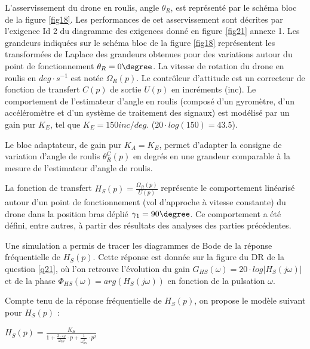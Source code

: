 L'asservissement du drone en roulis, angle $\theta_R$, est représenté par le schéma bloc de la figure \ref{fig18}. Les performances de cet asservissement sont décrites par l'exigence Id 2 du diagramme des exigences donné en figure \ref{fig21} annexe 1. Les grandeurs indiquées sur le schéma bloc de la figure \ref{fig18} représentent les transformées de Laplace des grandeurs obtenues pour des variations autour du point de fonctionnement $\theta_R=0\degree$. La vitesse de rotation du drone en roulis en $deg\cdot s^{-1}$ est notée $\Omega_R(p)$. Le contrôleur d'attitude est un correcteur de fonction de transfert $C(p)$ de sortie $U(p)$ en incréments (inc). Le comportement de l'estimateur d'angle en roulis (composé d'un gyromètre, d'un accéléromètre et d'un système de traitement des signaux) est modélisé par un gain pur $K_E$, tel que $K_E= 150 inc/deg$. ($20\cdot log(150)=43.5$).

Le bloc adaptateur, de gain pur $K_A=K_E$, permet d'adapter la consigne de variation d'angle de roulis $\theta_R^C(p)$ en degrés en une grandeur comparable à la mesure de l'estimateur d'angle de roulis.

La fonction de transfert $H_S(p)=\frac{\Omega_R(p)}{U(p)}$ représente le comportement linéarisé autour d'un point de fonctionnement (vol d'approche à vitesse constante) du drone dans la position bras déplié $\gamma_1=90\degree$. Ce comportement a été défini, entre autres, à partir des résultats des analyses des parties précédentes.

Une simulation a permis de tracer les diagrammes de Bode de la réponse fréquentielle de $H_S(p)$. Cette réponse est donnée sur la figure du DR de la question \ref{q21}, où l'on retrouve l'évolution du gain $G_{HS}(\omega)=20\cdot log|H_S(j\omega)|$ et de la phase $\Phi_{HS}(\omega)=arg(H_S(j\omega))$ en fonction de la pulsation $\omega$.

Compte tenu de la réponse fréquentielle de $H_S(p)$, on propose le modèle suivant pour $H_S(p)$ :
\begin{center}
$H_S(p)=\frac{K_S}{1+\frac{2\cdot z_S}{\omega_{0S}}\cdot p+\frac{1}{\omega_{0S}^2}\cdot p^2}$
\end{center}


